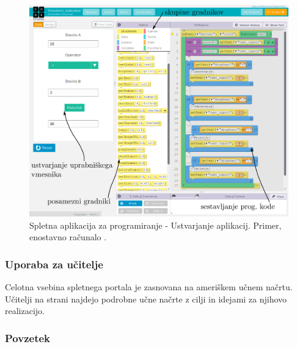 \begin{figure}[h!]
  \centering
    \includegraphics [width=0.90\linewidth, keepaspectratio =
    1] {./images/sc_web/code_cs_mobile.jpg}
    \caption{Spletna aplikacija za programiranje - Ustvarjanje
      aplikacij. Primer, enostavno računalo \cite{web:code.org:studio}.}
    \label{fig:scr:web:code:mp:app}
  \end{figure}

\subsubsection{Uporaba za učitelje}
\label{sec:uporaba-za-uitelje}

Celotna vsebina spletnega portala je zasnovana na ameriškem učnem
načrtu. Učitelji na strani najdejo podrobne učne načrte z cilji in
idejami za njihovo realizacijo. 

\subsubsection{Povzetek}
\label{sec:povzetek-code}

